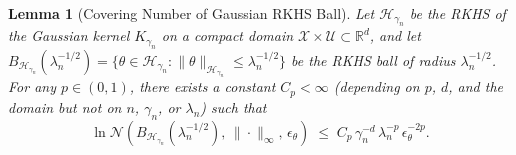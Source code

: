 \documentclass[12pt]{article}
\newtheorem{lemma}{Lemma}%
\newtheorem{remark}{Remark}
\begin{document}



\begin{lemma}[Covering Number of Gaussian RKHS Ball]\label{lemma:covering_number_rkhs}
Let $\mathcal{H}_{\gamma_n}$ be the RKHS of the Gaussian kernel $K_{\gamma_n}$ on a compact domain $\mathcal{X}\times\mathcal{U}\subset\mathbb{R}^d$, and let $B_{\mathcal{H}_{\gamma_n}}(\lambda_n^{-1/2})=\{\theta\in\mathcal{H}_{\gamma_n}:\|\theta\|_{\mathcal{H}_{\gamma_n}}\leq\lambda_n^{-1/2}\}$ be the RKHS ball of radius $\lambda_n^{-1/2}$. For any $p\in(0,1)$, there exists a constant $C_p<\infty$ (depending on $p$, $d$, and the domain but not on $n$, $\gamma_n$, or $\lambda_n$) such that
\[
\ln\mathcal{N}\!\left(B_{\mathcal{H}_{\gamma_n}}(\lambda_n^{-1/2}),\,\|\cdot\|_\infty,\,\epsilon_\theta\right)
\;\leq\; C_p\,\gamma_n^{-d}\,\lambda_n^{-p}\,\epsilon_\theta^{-2p}.
\]
\end{lemma}
\end{document}
